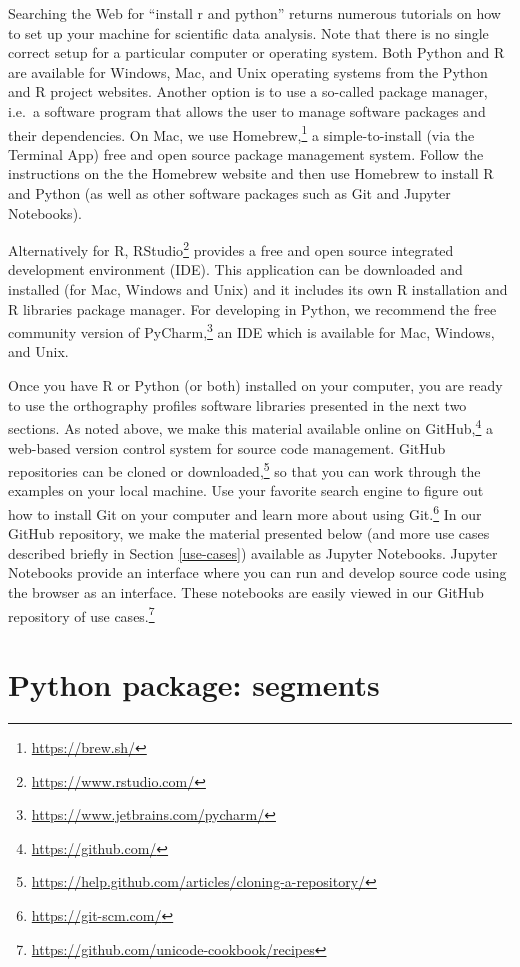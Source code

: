 \documentclass[output=inprep,
		biblatex
		]{LSP/langsci}\usepackage[]{graphicx}\usepackage[]{color}
\begin{document}
Searching the Web for ``install r and python'' returns numerous tutorials on how to set up your machine for scientific data analysis. Note that there is no single correct setup for a particular computer or operating system. Both Python and R are available for Windows, Mac, and Unix operating systems from the Python and R project websites. Another option is to use a so-called package manager, i.e.\ a software program that allows the user to manage software packages and their dependencies. On Mac, we use Homebrew,\footnote{\url{https://brew.sh/}} a simple-to-install (via the Terminal App) free and open source package management system. Follow the instructions on the the Homebrew website and then use Homebrew to install R and Python (as well as other software packages such as Git and Jupyter Notebooks). 

Alternatively for R, RStudio\footnote{\url{https://www.rstudio.com/}} provides a free and open source integrated development environment (IDE). This application can be downloaded and installed (for Mac, Windows and Unix) and it includes its own R installation and R libraries package manager. For developing in Python, we recommend the free community version of PyCharm,\footnote{\url{https://www.jetbrains.com/pycharm/}} an IDE which is available for Mac, Windows, and Unix. 

Once you have R or Python (or both) installed on your computer, you are ready to use the orthography profiles software libraries presented in the next two sections. As noted above, we make this material available online on GitHub,\footnote{\url{https://github.com/}} a web-based version control system for source code management. GitHub repositories can be cloned or downloaded,\footnote{\url{https://help.github.com/articles/cloning-a-repository/}} so that you can work through the examples on your local machine. Use your favorite search engine to figure out how to install Git on your computer and learn more about using Git.\footnote{\url{https://git-scm.com/}} In our GitHub repository, we make the material presented below (and more use cases described briefly in Section \ref{use-cases}) available as Jupyter Notebooks. Jupyter Notebooks provide an interface where you can run and develop source code using the browser as an interface. These notebooks are easily viewed in our GitHub repository of use cases.\footnote{\url{https://github.com/unicode-cookbook/recipes}}



\section{Python package: segments}
\label{python-implementations}
\end{document}
